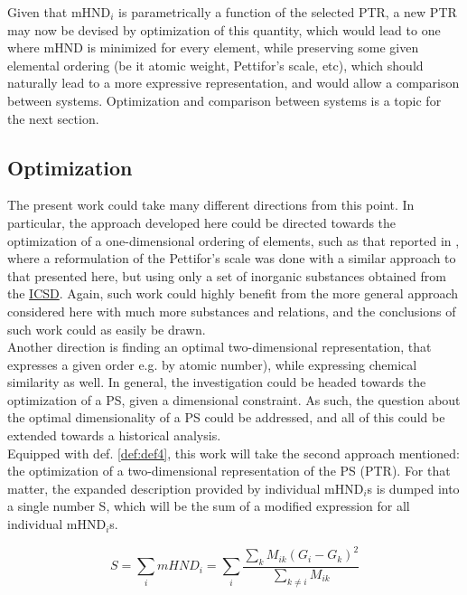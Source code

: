 \documentclass[article]{article}
\begin{document}
Given that mHND$_i$ is parametrically a function of the selected PTR, a new PTR may now be devised by optimization of this quantity, which would lead to one where mHND is minimized for every element, while preserving some given elemental ordering (be it atomic weight, Pettifor's scale, etc), which should naturally lead to a more expressive representation, and would allow a comparison between systems. Optimization and comparison between systems is a topic for the next section.\\

\subsection{Optimization}

The present work could take many different directions from this point. In particular, the approach developed here could be directed towards the optimization of a one-dimensional ordering of elements, such as that reported in \cite{Glawe_2016}, where a reformulation of the Pettifor's scale was done with a similar approach to that presented here, but using only a set of inorganic substances obtained from the \href{https://ucsd.libguides.com/crystallography/icsd}{ICSD}. Again, such work could highly benefit from the more general approach considered here with much more substances and relations, and the conclusions of such work could as easily be drawn.\\

Another direction is finding an optimal two-dimensional representation, that expresses a given order e.g. by atomic number), while expressing chemical similarity as well. In general, the investigation could be headed towards the optimization of a PS, given a dimensional constraint. As such, the question about the optimal dimensionality of a PS could be addressed, and all of this could be extended towards a historical analysis.\\

Equipped with def. \ref{def:def4}, this work will take the second approach mentioned: the optimization of a two-dimensional representation of the PS (PTR). For that matter, the expanded description provided by individual mHND$_i$s is dumped into a single number S, which will be the sum of a modified expression for all individual mHND$_i$s.

\begin{equation}
\label{eq:eq1}
	S = \sum_i mHND_i = \sum_i \frac{\sum_k M_{ik} (G_i - G_k)^2}{\sum_{k \neq i} M_{ik}}
\end{equation}
\end{document}
